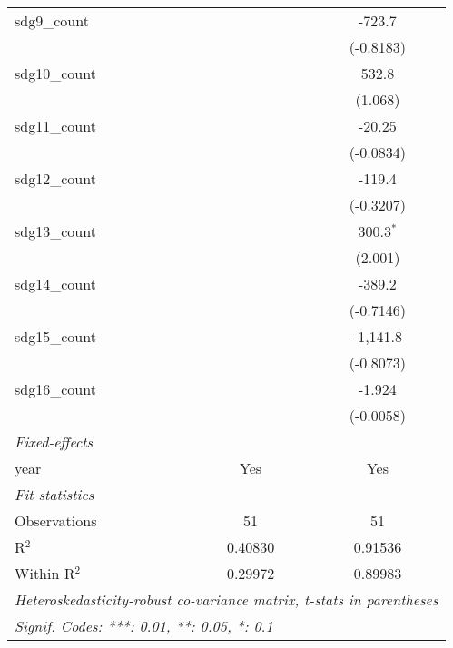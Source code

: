 \begin{tabular}{lcc}
   sdg9\_count       &                & -723.7\\   
                     &                & (-0.8183)\\   
   sdg10\_count      &                & 532.8\\   
                     &                & (1.068)\\   
   sdg11\_count      &                & -20.25\\   
                     &                & (-0.0834)\\   
   sdg12\_count      &                & -119.4\\   
                     &                & (-0.3207)\\   
   sdg13\_count      &                & 300.3$^{*}$\\   
                     &                & (2.001)\\   
   sdg14\_count      &                & -389.2\\   
                     &                & (-0.7146)\\   
   sdg15\_count      &                & -1,141.8\\   
                     &                & (-0.8073)\\   
   sdg16\_count      &                & -1.924\\   
                     &                & (-0.0058)\\   
   \midrule
   \emph{Fixed-effects}\\
   year              & Yes            & Yes\\  
   \midrule
   \emph{Fit statistics}\\
   Observations      & 51             & 51\\  
   R$^2$             & 0.40830        & 0.91536\\  
   Within R$^2$      & 0.29972        & 0.89983\\  
   \midrule \midrule
   \multicolumn{3}{l}{\emph{Heteroskedasticity-robust co-variance matrix, t-stats in parentheses}}\\
   \multicolumn{3}{l}{\emph{Signif. Codes: ***: 0.01, **: 0.05, *: 0.1}}\\
\end{tabular}
\par\endgroup


